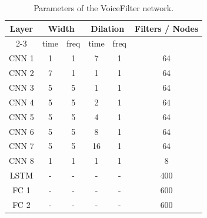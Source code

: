 \begin{table}[htbp]
    \centering
    \begin{tabular}{|c|c|c|c|c|c|}
        \hline
        \multirow{2}{*}{\textbf{Layer}} & \multicolumn{2}{c|}{\textbf{Width}} & \multicolumn{2}{c|}{\textbf{Dilation}} & \multirow{2}{*}{\textbf{Filters / Nodes}}              \\
        \cline{2-3} \cline{4-5}
                                        & time                                & freq                                   & time                                      & freq &     \\
        \hline
        CNN 1                           & 1                                   & 1                                      & 7                                         & 1    & 64  \\
        CNN 2                           & 7                                   & 1                                      & 1                                         & 1    & 64  \\
        CNN 3                           & 5                                   & 5                                      & 1                                         & 1    & 64  \\
        CNN 4                           & 5                                   & 5                                      & 2                                         & 1    & 64  \\
        CNN 5                           & 5                                   & 5                                      & 4                                         & 1    & 64  \\
        CNN 6                           & 5                                   & 5                                      & 8                                         & 1    & 64  \\
        CNN 7                           & 5                                   & 5                                      & 16                                        & 1    & 64  \\
        CNN 8                           & 1                                   & 1                                      & 1                                         & 1    & 8   \\
        LSTM                            & -                                   & -                                      & -                                         & -    & 400 \\
        FC 1                            & -                                   & -                                      & -                                         & -    & 600 \\
        FC 2                            & -                                   & -                                      & -                                         & -    & 600 \\
        \hline
    \end{tabular}
    \caption{Parameters of the VoiceFilter network.}
    \label{tab:voicefilter-params}
\end{table}

